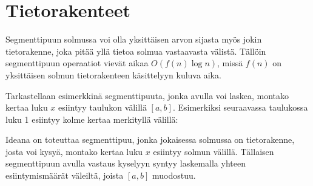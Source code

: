 \section{Tietorakenteet}

Segmenttipuun solmussa voi olla
yksittäisen arvon
sijasta myös jokin tietorakenne,
joka pitää yllä tietoa solmua vastaavasta välistä.
Tällöin segmenttipuun operaatiot vievät aikaa
$O(f(n) \log n)$, missä $f(n)$ on
yksittäisen solmun tietorakenteen
käsittelyyn kuluva aika.

Tarkastellaan esimerkkinä segmenttipuuta,
jonka avulla voi laskea, montako kertaa
luku $x$ esiintyy taulukon välillä $[a,b]$.
Esimerkiksi seuraavassa taulukossa
luku 1 esiintyy kolme kertaa
merkityllä välillä:

\begin{center}
\end{center}

Ideana on toteuttaa segmenttipuu, jonka
jokaisessa solmussa on tietorakenne,
josta voi kysyä,
montako kertaa luku $x$ esiintyy solmun välillä.
Tällaisen segmenttipuun avulla
vastaus kyselyyn syntyy laskemalla yhteen
esiintymismäärät väleiltä, joista $[a,b]$ muodostuu.

